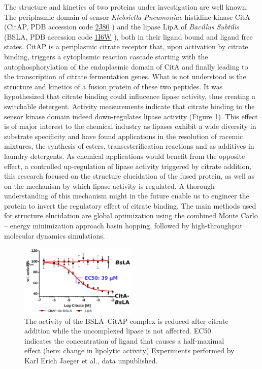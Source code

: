 \documentclass[english, a4paper, 12pt, titlepage, draft]{article}
\newcommand{\PDB}[1]{
    \href{http://pdb.rcsb.org/pdb/explore/explore.do?structureId=#1}{#1}
}
\begin{document}
The structure and kinetics of two proteins under investigation are well known:
The periplasmic domain of sensor \textit{Klebsiella Pneumoniae} histidine kinase CitA (CitAP, PDB accession code \PDB{2J80}) \cite{CitA_2J80}
and the lipase LipA of \textit{Bacillus Subtilis} (BSLA, PDB accession code \PDB{1I6W}), \cite{BSLA_1I6W} both in their ligand bound and ligand free states.
CitAP is a periplasmic citrate receptor that, upon activation by citrate binding, triggers a cytoplasmic reaction cascade starting with the autophosphorylation of the endoplasmic domain of CitA and finally leading to the transcription of citrate fermentation genes.
What is not understood is the structure and kinetics of a fusion protein of these two peptides.
It was hypothesized that citrate binding could influcence lipase activity, thus creating a switchable detergent.
Activity measurements indicate that citrate binding to the sensor kinase domain indeed down-regulates lipase activity (Figure \ref{fig:BSLAactivity}).
This effect is of major interest to the chemical industry as lipases exhibit a wide diversity in substrate specificity and have found applications in the resolution of racemic mixtures, the synthesis of esters, transesterification reactions and as additives in laundry detergents.
As chemical applications would benefit from the opposite effect, a controlled up-regulation of lipase activity triggered by citrate addition, this research focused on the structure elucidation of the fused protein, as well as on the mechanism by which lipase activity is regulated.
A thorough understanding of this mechanism might in the future enable us to engineer the protein to invert the regulatory effect of citrate binding.
The main methods used for structure elucidation are global optimization using the combined Monte Carlo -- energy minimization approach basin hopping, followed by high-throughput molecular dynamics simulations. 
 

\begin{figure}
    \centering
    \includegraphics[width=0.5\textwidth]{figures/BSLA_activity/BSLA_activity.png}
    \caption{The activity of the BSLA--CitAP complex is reduced after citrate addition while the uncomplexed lipase is not affected.
    EC50 indicates the concentration of ligand that causes a half-maximal effect (here: change in lipolytic activity)
    Experiments performed by Karl Erich Jaeger et al., data unpublished.}   
    \label{fig:BSLAactivity}
\end{figure}
\end{document}
